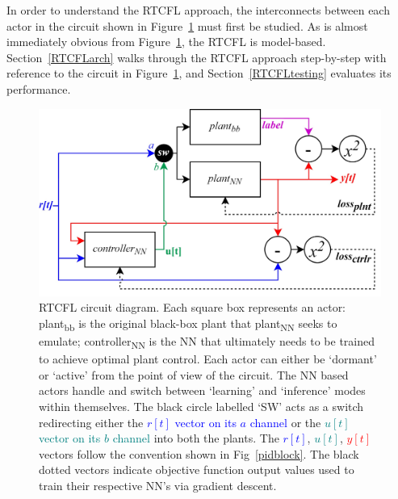 \documentclass[10pt,twocolumn,letterpaper]{article}
\begin{document}
        In order to understand the RTCFL approach, the interconnects between each actor in the circuit shown in
        Figure~\ref{rtcflcircuit} must first be studied. As is almost immediately obvious from
        Figure~\ref{rtcflcircuit}, the RTCFL is model-based. Section~\ref{RTCFLarch} walks through the RTCFL approach
        step-by-step with reference to the circuit in Figure~\ref{rtcflcircuit}, and Section~\ref{RTCFLtesting}
        evaluates its performance.

        \begin{figure}[h]
            \includegraphics[width=\linewidth]{./Figures/rtcfl-circuit.jpg}
            \centering
            \caption{RTCFL circuit diagram. Each square box represents an actor: plant\textsubscript{bb} is the original
                black-box plant that plant\textsubscript{NN} seeks to emulate; controller\textsubscript{NN} is the NN
                that ultimately needs to be trained to achieve optimal plant control. Each actor can either be `dormant'
                or `active' from the point of view of the circuit. The NN based actors handle and switch between
                `learning' and `inference' modes within themselves. The black circle labelled `SW' acts as a switch
                redirecting either the \textcolor{blue}{$r[t]$ vector on its $a$ channel} or the \textcolor{teal}{$u[t]$
                vector on its $b$ channel} into both the plants. The \textcolor{blue}{$r[t]$}, \textcolor{teal}{$u[t]$},
                \textcolor{red}{$y[t]$} vectors follow the convention shown in Fig~\ref{pidblock}. The black dotted
                vectors indicate objective function output values used to train their respective NN's via gradient
                descent.}
            \label{rtcflcircuit}
        \end{figure}
\end{document}
